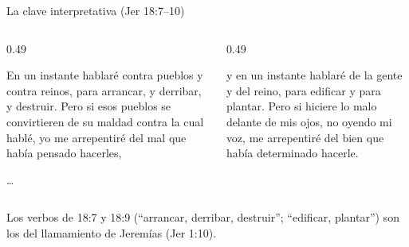 \begin{frame}{La clave interpretativa (Jer 18:7--10)}
\begin{columns}[t,onlytextwidth]
\begin{column}{0.49\textwidth}
\begin{cita}En un instante hablaré contra pueblos y contra reinos, para arrancar, y derribar, y destruir. Pero si esos pueblos se convirtieren de su maldad contra la cual hablé, yo me arrepentiré del mal que había pensado hacerles,\end{cita}
\begin{center}\ldots{} \end{center}
\end{column}
\begin{column}{0.49\textwidth}
\begin{cita}y en un instante hablaré de la gente y del reino, para edificar y para plantar. Pero si hiciere lo malo delante de mis ojos, no oyendo mi voz, me arrepentiré del bien que había determinado hacerle.\end{cita}
\begin{center}\end{center}
\end{column}
\end{columns}\par\smallskip
\small\RaggedRight Los verbos de 18:7 y 18:9 (``arrancar, derribar, destruir''; ``edificar, plantar'') son los del llamamiento de Jeremías (Jer 1:10).
\end{frame}

